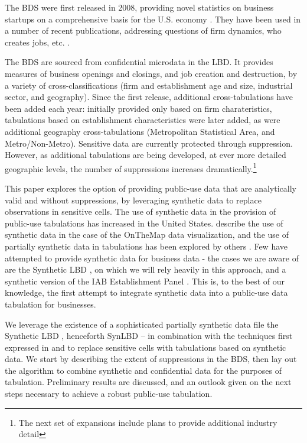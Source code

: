 
The \acf{BDS} were first released in 2008, providing novel statistics on business startups on a comprehensive basis for the U.S. economy \cite{BDS2}. They have been used in a number of recent publications, addressing questions of firm dynamics, who creates jobs, etc. \cite{NBERw16300}. 

The \ac{BDS} are sourced from confidential microdata in the \acf{LBD}. It
provides measures of business openings and closings, and job creation and destruction, by a variety of cross-classifications (firm and establishment age and size, industrial sector, and geography).
Since the first release, additional cross-tabulations have been added each year: initially provided only based on  firm charateristics, tabulations based on establishment characteristics were later added, as were additional geography cross-tabulations (Metropolitan Statistical Area, and Metro/Non-Metro).  Sensitive data are currently protected through suppression. However, as additional tabulations are being developed, at ever more detailed geographic levels, the number of suppressions increases dramatically.\footnote{The next set of expansions include plans to provide additional industry detail} 

This paper explores the option of providing public-use data that are analytically valid and 
without suppressions, by leveraging synthetic data to replace observations in sensitive cells. The 
use of synthetic data in the provision of public-use tabulations has increased in the United 
States. \cite{Ashwin2008} describe the use of synthetic data in the case of the OnTheMap data 
visualization, and the use of partially synthetic data in tabulations has been explored by others 
\cite{AbowdEtAl2012,DrechslerReiter2009,RePEc:cen:wpaper:13-19,Rodriguez2007,AbowdVilhuber2010}.
 Few have attempted to provide synthetic data for business data - the cases we are aware of are 
the Synthetic LBD \cite{KinneyEtAl2011}, on which we will rely heavily in this approach, and a 
synthetic version of the IAB Establishment Panel 
\cite{RePEc:iab:iabfme:201101_de,RePEc:iab:iabfme:201006_en,RePEc:taf:japsta:v:39:y:2012:i:2:p:243-265}.
 This is, to the best of our knowledge, the first attempt to integrate synthetic data into a 
public-use data tabulation for businesses.

We leverage the existence of a sophisticated partially synthetic data file the Synthetic LBD 
\cite{SynLBD20}, 
henceforth \acs{SynLBD} -- in combination with the techniques first expressed in 
\cite{Gittings2009thesis} and \cite{RePEc:bes:jnlasa:v:105:i:492:y:2010:p:1347-1357} to replace 
sensitive cells with tabulations based on synthetic 
data. We start by describing the extent of suppressions in the \ac{BDS}, then lay out the algorithm to combine synthetic and confidential data for the purposes of tabulation. Preliminary results are discussed, and an outlook given on the next steps necessary to achieve a robust public-use tabulation. 

